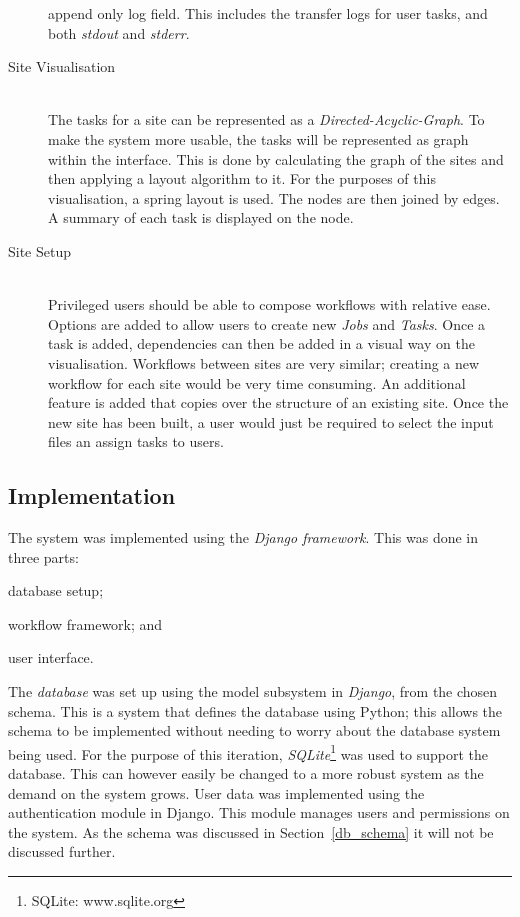 \documentclass[12pt,a4paper]{report}
\begin{document}
\begin{description}
        append only log field. This includes the transfer logs for user tasks, and both
        \emph{stdout} and \emph{stderr}.
    \item[Site Visualisation] \hfill \\
        The tasks for a site can be represented as a \emph{Directed-Acyclic-Graph}. To
        make the system  more usable, the tasks will be represented as
        graph within the interface. This is done by calculating the graph of
        the sites and then applying a layout algorithm to it. For the purposes of this
        visualisation, a spring layout is used. The nodes are then joined by edges. A
        summary of each task is displayed on the node.
    \item[Site Setup] \hfill \\
        Privileged users should be able to compose workflows with relative ease. Options
        are added to allow users to create new \emph{Jobs} and \emph{Tasks}.
	Once a task is added, dependencies can then be added in a visual way on the
	visualisation. Workflows between sites are very similar;
        creating a new workflow for each site would be very time consuming. An additional
        feature is added that copies over the structure of an existing site.
	Once the new site has been built, a user would just be required to
	select the input files an assign tasks to users.
\end{description}

\subsection{Implementation\label{iter2_impl}}

The system was implemented using the \emph{Django framework}. This was done in three parts:
\begin{inparaenum}[(i)]
\item database setup;
\item workflow framework; and
\item user interface.
\end{inparaenum}

The \emph{database} was set up using the model subsystem in \emph{Django}, from the chosen schema.
This is a system that defines the database using Python; this allows the schema
to be implemented without needing to worry about the database system being used. For the
purpose of this iteration, \emph{SQLite}\footnote{SQLite: www.sqlite.org} was used to
support the database. This can however easily be changed to a more robust system as the demand
on the system grows. User data was implemented using the authentication module in Django. This
module manages users and permissions on the system. As the schema was discussed in Section~\ref{db_schema}
it will not be discussed further.
\end{document}
